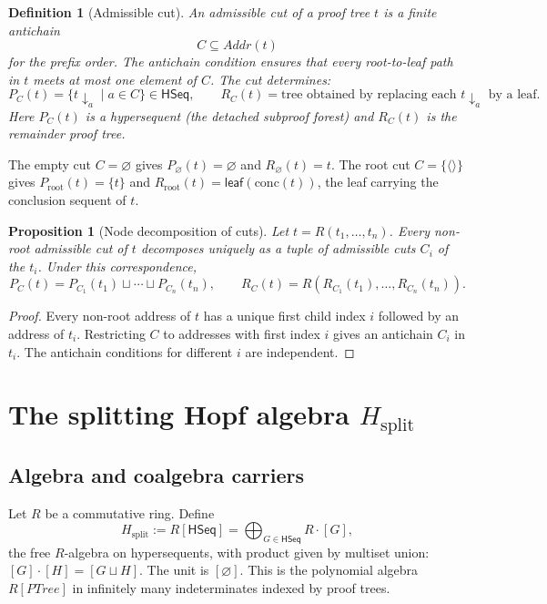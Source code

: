 \documentclass[11pt]{article}
\newtheorem{proposition}[theorem]{Proposition}
\newtheorem{definition}[theorem]{Definition}
\newcommand{\PTree}{\mathit{PTree}}
\newcommand{\Addr}{\mathit{Addr}}
\begin{document}
\begin{definition}[Admissible cut]
An \emph{admissible cut} of a proof tree $t$ is a finite antichain
\[
C\subseteq\Addr(t)
\]
for the prefix order.  The antichain condition ensures that every root-to-leaf path in $t$ meets at most one element of $C$.  The cut determines:
\[
P_C(t) = \{t\!\downarrow_a \mid a\in C\}\in\mathsf{HSeq},
\qquad
R_C(t) = \text{tree obtained by replacing each }t\!\downarrow_a\text{ by a leaf.}
\]
Here $P_C(t)$ is a hypersequent (the detached subproof forest) and $R_C(t)$ is the remainder proof tree.
\end{definition}

The empty cut $C=\varnothing$ gives $P_\varnothing(t)=\varnothing$ and $R_\varnothing(t)=t$.  The root cut $C=\{\langle\rangle\}$ gives $P_{\mathrm{root}}(t)=\{t\}$ and $R_{\mathrm{root}}(t)=\mathsf{leaf}(\mathrm{conc}(t))$, the leaf carrying the conclusion sequent of $t$.

\begin{proposition}[Node decomposition of cuts]
Let $t=R(t_1,\ldots,t_n)$.  Every non-root admissible cut of $t$ decomposes uniquely as a tuple of admissible cuts $C_i$ of the $t_i$.  Under this correspondence,
\[
P_C(t) = P_{C_1}(t_1)\sqcup\cdots\sqcup P_{C_n}(t_n),
\qquad
R_C(t) = R(R_{C_1}(t_1),\ldots,R_{C_n}(t_n)).
\]
\end{proposition}

\begin{proof}
Every non-root address of $t$ has a unique first child index $i$ followed by an address of $t_i$.  Restricting $C$ to addresses with first index $i$ gives an antichain $C_i$ in $t_i$.  The antichain conditions for different $i$ are independent.
\end{proof}

\section{The splitting Hopf algebra \texorpdfstring{$H_{\mathrm{split}}$}{H-split}}

\subsection{Algebra and coalgebra carriers}

Let $R$ be a commutative ring.  Define
\[
H_{\mathrm{split}} := R[\mathsf{HSeq}] = \bigoplus_{G\in\mathsf{HSeq}} R\cdot [G],
\]
the free $R$-algebra on hypersequents, with product given by multiset union: $[G]\cdot[H]=[G\sqcup H]$.  The unit is $[\varnothing]$.  This is the polynomial algebra $R[\PTree]$ in infinitely many indeterminates indexed by proof trees.
\end{document}
